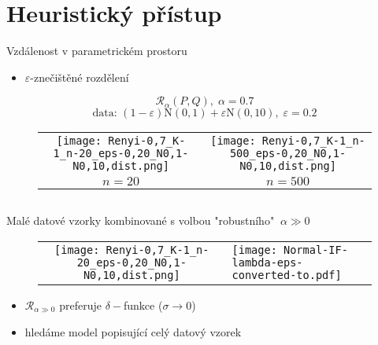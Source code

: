 \documentclass[11pt]{beamer}
\begin{document}
\section{Heuristický přístup} %
\begin{frame}{Vzdálenost v parametrickém prostoru}
\begin{itemize}
\item $\varepsilon$-znečištěné rozdělení
\end{itemize}

	\[ \mathcal{R}_\alpha(P,Q), \; \alpha = 0.7\]
	\[ \text{data: }(1-\varepsilon)\mathrm{N}(0,1) + \varepsilon \mathrm{N}(0,10), \; \varepsilon =  0.2 \]
\begin{center}
	\vspace{-0.3in}
	\begin{figure}[htb]
	\begin{tabular}{cc}
		\texttt{[image: Renyi-0,7\_K-1\_n-20\_eps-0,20\_N0,1-N0,10,dist.png]}			
		&
		\texttt{[image: Renyi-0,7\_K-1\_n-500\_eps-0,20\_N0,1-N0,10,dist.png]}
		\\
		{\footnotesize $n = 20$}
		&
		{\footnotesize $n = 500$}	
		
	\end{tabular}
	\end{figure}
	\end{center}
    $\;$\\$\;$\\
\end{frame}


\begin{frame}
	Malé datové vzorky kombinované s volbou "robustního"  $\:\alpha \gg 0$ 
		\vspace{-0.2in}
		\begin{figure}[htb]
		\begin{tabular}{cl}		
		\texttt{[image: Renyi-0,7\_K-1\_n-20\_eps-0,20\_N0,1-N0,10,dist.png]}				&
		\texttt{[image: Normal-IF-lambda-eps-converted-to.pdf]}		
		\end{tabular}
		\end{figure}
		\begin{itemize}
		\item $\mathcal{R}_{\alpha\gg 0}$ preferuje $\delta-$funkce ($\sigma \rightarrow 0$) 
		\item hledáme model popisující celý datový vzorek
		\end{itemize}
	
\end{frame}
\end{document}
